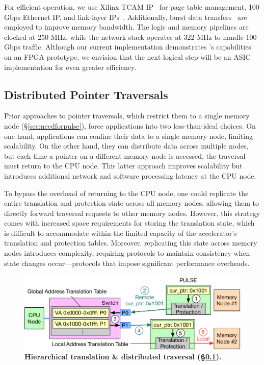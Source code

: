 For efficient operation, we use Xilinx TCAM IP~\cite{tcam_ip} for page table management, 100 Gbps Ethernet IP, and link-layer IPs~\cite{xilinx_network}. Additionally, burst data transfers~\cite{burstdatatransfer} are employed to improve memory bandwidth. The logic and memory pipelines are clocked at 250 MHz, while the network stack operates at 322 MHz to handle 100 Gbps traffic. Although our current implementation demonstrates \pulse's capabilities on an FPGA prototype, we envision that the next logical step will be an ASIC implementation for even greater efficiency.

\subsection{Distributed Pointer Traversals}
\label{ssec:pulsedistributed}

Prior approaches to pointer traversals, which restrict them to a single memory node (\S\ref{sec:needforpulse}), force applications into two less-than-ideal choices. On one hand, applications can confine their data to a single memory node, limiting scalability. On the other hand, they can distribute data across multiple nodes, but each time a pointer on a different memory node is accessed, the traversal must return to the CPU node. This latter approach improves scalability but introduces additional network and software processing latency at the CPU node.

To bypass the overhead of returning to the CPU node, one could replicate the entire translation and protection state across all memory nodes, allowing them to directly forward traversal requests to other memory nodes. However, this strategy comes with increased space requirements for storing the translation state, which is difficult to accommodate within the limited capacity of the accelerator's translation and protection tables. Moreover, replicating this state across memory nodes introduces complexity, requiring protocols to maintain consistency when state changes occur—protocols that impose significant performance overheads.


\begin{figure}[t]
\centering
\includegraphics[width=0.7\columnwidth]{fig/pulse/hierarchical.pdf}
\caption[Hierarchical translation \& distributed traversal]{\textbf{Hierarchical translation \& distributed traversal (\S\ref{ssec:pulsedistributed}).}}
\label{fig:hierarchical}
\end{figure}

